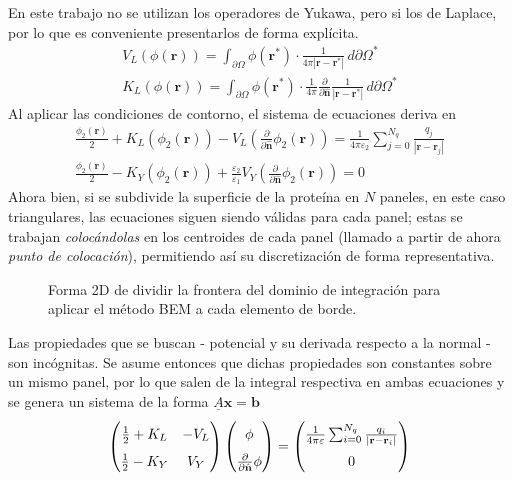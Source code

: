 \documentclass[12pt, oneside, numbers, spanish]{ezthesis}
\numberwithin{equation}{section}
\begin{document}
En este trabajo no se utilizan los operadores de Yukawa, pero si los de Laplace, por lo que es conveniente presentarlos de forma explícita.
\begin{gather}
	V_L(\phi(\mathbf{r})) = \int_{\partial\Omega}\phi(\mathbf{r}^*)\cdot \frac{1}{4\pi|\mathbf{r}-\mathbf{r}^*|}\, d \partial\Omega^* \label{eqn:SLO_Laplace}\\
	K_L(\phi(\mathbf{r})) = \int_{\partial\Omega}\phi(\mathbf{r}^*)\cdot \frac{1}{4\pi}\frac{\partial}{\partial\hat{\mathbf{n}}}\frac{1}{|\mathbf{r}-\mathbf{r}^*|}\, d\partial\Omega^*\label{eqn:DLO_Laplace}
\end{gather}
Al aplicar las condiciones de contorno, el sistema de ecuaciones deriva en
\begin{gather}
		\frac{\phi_2(\mathbf{r})}{2} + K_L(\phi_2(\mathbf{r})) - V_L\left(\frac{\partial}{\partial\hat{\mathbf{n}}}\phi_2(\mathbf{r})\right) = \frac{1}{4\pi\varepsilon_2}\sum_{j=0}^{N_q}\frac{q_j}{|\mathbf{r} - \mathbf{r}_j|}\\
		\frac{\phi_2(\mathbf{r})}{2} - K_Y(\phi_2(\mathbf{r})) + \frac{\varepsilon_2}{\varepsilon_1}V_Y\left(\frac{\partial}{\partial\hat{\mathbf{n}}}\phi_2(\mathbf{r})\right) = 0
\end{gather}
Ahora bien, si se subdivide la superficie de la proteína en $N$ paneles, en este caso triangulares, las ecuaciones siguen siendo válidas para cada panel; estas se trabajan \textit{colocándolas} en los centroides de cada panel (llamado a partir de ahora \textit{punto de colocación}), permitiendo así su discretización de forma representativa.
\begin{figure}[H]
	\centering
	
	\caption{Forma 2D de dividir la frontera del dominio de integración para aplicar el método BEM a cada elemento de borde.}
\end{figure}
\noindent
Las propiedades que se buscan - potencial y su derivada respecto a la normal - son incógnitas. Se asume entonces que dichas propiedades son constantes sobre un mismo panel, por lo que salen de la integral respectiva en ambas ecuaciones y se genera un sistema de la forma $\underline{A}\mathbf{x} = \mathbf{b}$
\begin{equation}\label{eqn:PB_equation_system}
	\renewcommand\arraystretch{1.6}
	\begin{pmatrix}
		\frac{1}{2} + K_L & -V_L \\ \frac{1}{2} - K_Y & V_Y
	\end{pmatrix}
	\begin{pmatrix}
		\phi \\ \frac{\partial}{\partial\hat{\mathbf{n}}}\phi
	\end{pmatrix}
	=
	\begin{pmatrix}
		\frac{1}{4\pi\varepsilon}\sum_{i=0}^{N_q}\frac{q_i}{|\mathbf{r} - \mathbf{r}_i|} \\ 0
	\end{pmatrix}
\end{equation}
\end{document}
